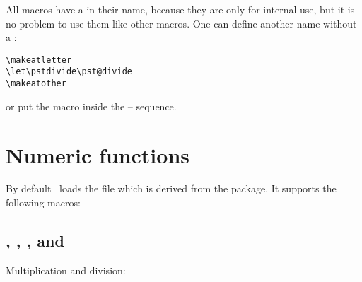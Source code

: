 \documentclass[11pt,english,BCOR10mm,DIV12,bibliography=totoc,parskip=false,smallheadings
    headexclude,footexclude,oneside]{pst-doc}
\let\Lfile\LFile
\def\textat{\char064}
\begin{document}
All macros have a \textat{} in their name, because they are
only for internal use, but it is no problem to use them like other
macros. One can define another name without a \textat{}:
\begin{lstlisting}[style=syntax]
\makeatletter
\let\pstdivide\pst@divide
\makeatother
\end{lstlisting}

or put the macro inside the  --  sequence.


\section{Numeric functions}

By default \PST\ loads the file \Lfile{pst-fp} which is derived from the
 package. It supports the following macros:

\subsection{, , , and }
Multiplication and division:

\begin{BDef}
\\
\\
\\
\end{BDef}

\begin{LTXexample}[width=5cm]
\pstFPmul{} \Result\quad
\pstFPdiv{} \Result\\
\pstFPmul{} \Result\quad
\pstFPdiv{} \Result\\
\pstFPmul{} \Result\quad
\pstFPdiv{} \Result\\
\pstFPadd{} \Result\quad
\pstFPadd{} \Result\\
\pstFPsub{} \Result\quad
\pstFPsub{} \Result
\end{LTXexample}
\end{document}
